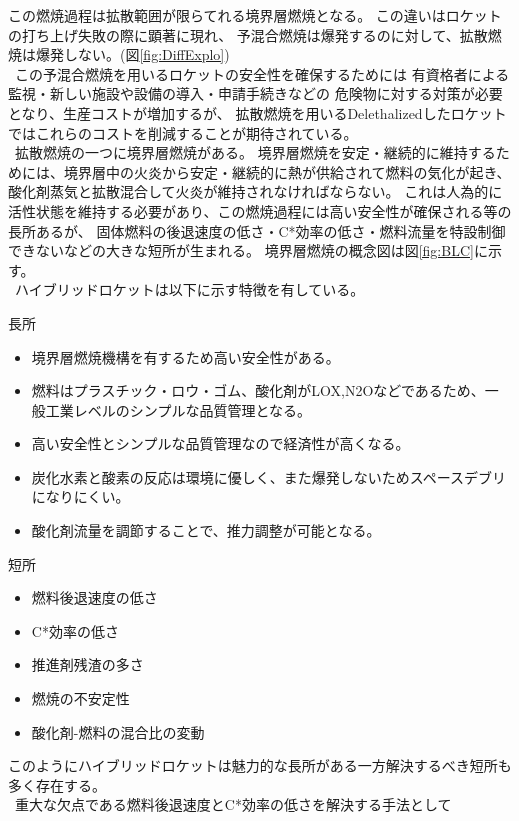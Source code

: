 この燃焼過程は拡散範囲が限らてれる境界層燃焼となる。
この違いはロケットの打ち上げ失敗の際に顕著に現れ、
予混合燃焼は爆発するのに対して、拡散燃焼は爆発しない。(図\ref{fig:DiffExplo})
\\
\ 
この予混合燃焼を用いるロケットの安全性を確保するためには
有資格者による監視・新しい施設や設備の導入・申請手続きなどの
危険物に対する対策が必要となり、生産コストが増加するが、
拡散燃焼を用いるDelethalizedしたロケットではこれらのコストを削減することが期待されている。
\\
\ 
拡散燃焼の一つに境界層燃焼がある。
境界層燃焼を安定・継続的に維持するためには、境界層中の火炎から安定・継続的に熱が供給されて燃料の気化が起き、
酸化剤蒸気と拡散混合して火炎が維持されなければならない。
これは人為的に活性状態を維持する必要があり、この燃焼過程には高い安全性が確保される等の長所あるが、
固体燃料の後退速度の低さ・C*効率の低さ・燃料流量を特設制御できないなどの大きな短所が生まれる。
境界層燃焼の概念図は図\ref{fig:BLC}に示す。
\\
\ 
ハイブリッドロケットは以下に示す特徴を有している。
\begin{description}
	\item 長所
	\begin{itemize}
		\item 境界層燃焼機構を有するため高い安全性がある。
		\item 燃料はプラスチック・ロウ・ゴム、酸化剤がLOX,N2Oなどであるため、一般工業レベルのシンプルな品質管理となる。
		\item 高い安全性とシンプルな品質管理なので経済性が高くなる。
		\item 炭化水素と酸素の反応は環境に優しく、また爆発しないためスペースデブリになりにくい。
		\item 酸化剤流量を調節することで、推力調整が可能となる。
	\end{itemize}
	\item 短所
	\begin{itemize}
		\item 燃料後退速度の低さ
		\item C*効率の低さ
		\item 推進剤残渣の多さ
		\item 燃焼の不安定性
		\item 酸化剤-燃料の混合比の変動
	\end{itemize}
\end{description}
このようにハイブリッドロケットは魅力的な長所がある一方解決するべき短所も多く存在する。
\\
\ 
重大な欠点である燃料後退速度とC*効率の低さを解決する手法として
